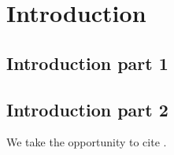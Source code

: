 \chapter{Introduction} \label{chap:intro}



\section{Introduction part 1} \label{sec:intro-1}
\section{Introduction part 2} \label{sec:intro-2}
We take the opportunity to cite \cite{Arnowitt:1962hi,  Akerib:2013tjd, Abbott:2016blz}.


